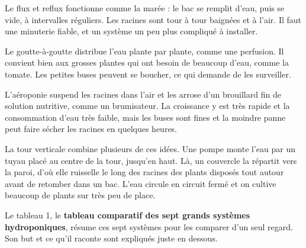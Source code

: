 \documentclass[11pt,a4paper]{article}
\begin{document}
Le flux et reflux fonctionne comme la marée : le bac se remplit d'eau, puis se vide, à intervalles réguliers. Les racines sont tour à tour baignées et à l'air. Il faut une minuterie fiable, et un système un peu plus compliqué à installer.

Le goutte-à-goutte distribue l'eau plante par plante, comme une perfusion. Il convient bien aux grosses plantes qui ont besoin de beaucoup d'eau, comme la tomate. Les petites buses peuvent se boucher, ce qui demande de les surveiller.

L'aéroponie suspend les racines dans l'air et les arrose d'un brouillard fin de solution nutritive, comme un brumisateur. La croissance y est très rapide et la consommation d'eau très faible, mais les buses sont fines et la moindre panne peut faire sécher les racines en quelques heures.

La tour verticale combine plusieurs de ces idées. Une pompe monte l'eau par un tuyau placé au centre de la tour, jusqu'en haut. Là, un couvercle la répartit vers la paroi, d'où elle ruisselle le long des racines des plants disposés tout autour avant de retomber dans un bac. L'eau circule en circuit fermé et on cultive beaucoup de plants sur très peu de place.

Le tableau 1, le \textbf{tableau comparatif des sept grands systèmes hydroponiques}, résume ces sept systèmes pour les comparer d'un seul regard. Son but et ce qu'il raconte sont expliqués juste en dessous.
\end{document}

